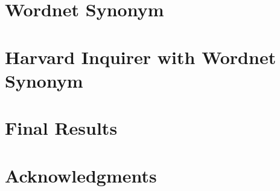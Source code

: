 \documentclass[11pt,letterpaper]{article}
\begin{document}
\section{Wordnet Synonym}


\section{Harvard Inquirer with Wordnet Synonym}

\section{Final Results}


\section*{Acknowledgments}





%
%
%
%

\end{document}
